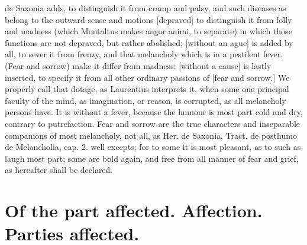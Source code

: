 {{de Saxonia adds, to distinguish it from cramp and palsy, and such
diseases as belong to the outward sense and motions [depraved] to
distinguish it from folly and madness (which Montaltus makes angor
animi, to separate) in which those functions are not depraved, but
rather abolished; [without an ague] is added by all, to sever it from
frenzy, and that melancholy which is in a pestilent fever. (Fear and
sorrow) make it differ from madness: [without a cause] is lastly
inserted, to specify it from all other ordinary passions of [fear and
sorrow.] We properly call that dotage, as Laurentius interprets
it, when some one principal faculty of the mind, as imagination, or
reason, is corrupted, as all melancholy persons have. It is without a
fever, because the humour is most part cold and dry, contrary to
putrefaction. Fear and sorrow are the true characters and inseparable
companions of most melancholy, not all, as Her. de Saxonia, Tract. de
posthumo de Melancholia, cap. 2. well excepts; for to some it is most
pleasant, as to such as laugh most part; some are bold again, and free
from all manner of fear and grief, as hereafter shall be declared.

\section{Of the part affected. Affection. Parties affected.}\label{sec:parts-affected}

}}
